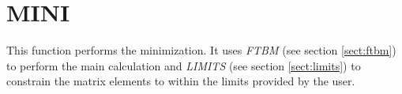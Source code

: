 \section{MINI}
\label{sect:mini}

\noindent This function performs the minimization. It uses {\em FTBM} (see
section \ref{sect:ftbm}) to perform the main calculation and {\em LIMITS}
(see section \ref{sect:limits}) to constrain the matrix elements to within
the limits provided by the user.\\

